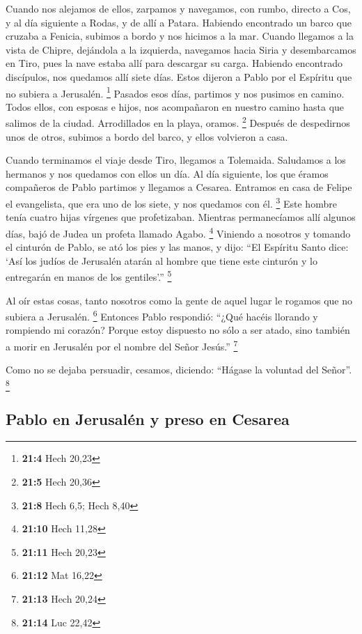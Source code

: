  Cuando nos alejamos de ellos, zarpamos y navegamos, con
rumbo, directo a Cos, y al día siguiente a Rodas, y de allí a Patara.
 Habiendo encontrado un barco que cruzaba a Fenicia,
subimos a bordo y nos hicimos a la mar.  Cuando llegamos a
la vista de Chipre, dejándola a la izquierda, navegamos hacia Siria y
desembarcamos en Tiro, pues la nave estaba allí para descargar su carga.
 Habiendo encontrado discípulos, nos quedamos allí siete
días. Estos dijeron a Pablo por el Espíritu que no subiera a Jerusalén.
\footnote{\textbf{21:4} Hech 20,23}  Pasados esos días,
partimos y nos pusimos en camino. Todos ellos, con esposas e hijos, nos
acompañaron en nuestro camino hasta que salimos de la ciudad.
Arrodillados en la playa, oramos. \footnote{\textbf{21:5} Hech 20,36}
 Después de despedirnos unos de otros, subimos a bordo del
barco, y ellos volvieron a casa.

 Cuando terminamos el viaje desde Tiro, llegamos a
Tolemaida. Saludamos a los hermanos y nos quedamos con ellos un día.
 Al día siguiente, los que éramos compañeros de Pablo
partimos y llegamos a Cesarea. Entramos en casa de Felipe el
evangelista, que era uno de los siete, y nos quedamos con él.
\footnote{\textbf{21:8} Hech 6,5; Hech 8,40}  Este hombre
tenía cuatro hijas vírgenes que profetizaban.  Mientras
permanecíamos allí algunos días, bajó de Judea un profeta llamado Agabo.
\footnote{\textbf{21:10} Hech 11,28}  Viniendo a nosotros
y tomando el cinturón de Pablo, se ató los pies y las manos, y dijo:
``El Espíritu Santo dice: `Así los judíos de Jerusalén atarán al hombre
que tiene este cinturón y lo entregarán en manos de los gentiles'.''
\footnote{\textbf{21:11} Hech 20,23}

 Al oír estas cosas, tanto nosotros como la gente de
aquel lugar le rogamos que no subiera a Jerusalén. \footnote{\textbf{21:12}
  Mat 16,22}  Entonces Pablo respondió: ``¿Qué hacéis
llorando y rompiendo mi corazón? Porque estoy dispuesto no sólo a ser
atado, sino también a morir en Jerusalén por el nombre del Señor
Jesús.'' \footnote{\textbf{21:13} Hech 20,24}

 Como no se dejaba persuadir, cesamos, diciendo: ``Hágase
la voluntad del Señor''. \footnote{\textbf{21:14} Luc 22,42}

\hypertarget{pablo-en-jerusaluxe9n-y-preso-en-cesarea}{%
\subsection{Pablo en Jerusalén y preso en
Cesarea}\label{pablo-en-jerusaluxe9n-y-preso-en-cesarea}}

